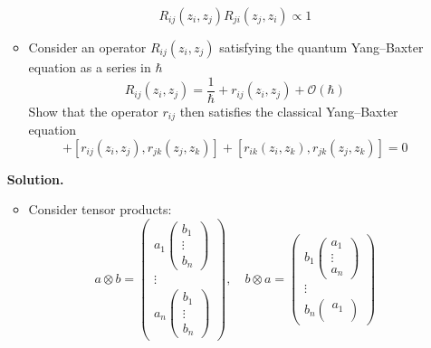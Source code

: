 \documentclass[12pt]{article}
\theoremstyle{definition}
\begin{document}
\begin{enumerate}
\begin{itemize}
\begin{equation}
            R_{ij}(z_i,z_j)R_{ji}(z_j,z_i)\propto 1
        \end{equation}
        \item Consider an operator $R_{ij} (z_i, z_j )$ satisfying the quantum Yang–Baxter equation as a series in $\hbar$
        \begin{equation}
            R_{ij}(z_i,z_j) = \frac{1}{\hbar} + r_{ij}(z_i,z_j) + \mathcal{O}(\hbar)
        \end{equation}
        Show that the operator $r_{ij}$ then satisfies the classical Yang–Baxter equation
        \begin{equation}
            [r_{ij}(z_i, z_j), r_{ik}(z_i, z_k)] + [r_{ij}(z_i, z_j), r_{jk}(z_j, z_k)] + [r_{ik}(z_i, z_k), r_{jk}(z_j, z_k)] = 0
        \end{equation}
    \end{itemize}
    \textbf{Solution.}
    \begin{itemize}
        \item Consider tensor products:
        \begin{equation}
            a\otimes b=\begin{pmatrix}
                a_1\begin{pmatrix}
                    b_1\\
                    \vdots\\
                    b_n
                \end{pmatrix}\\
                \vdots\\
                a_n\begin{pmatrix}
                    b_1\\
                    \vdots\\
                    b_n
                \end{pmatrix}
            \end{pmatrix},\quad b\otimes a=\begin{pmatrix}
                b_1\begin{pmatrix}
                    a_1\\
                    \vdots\\
                    a_n
                \end{pmatrix}\\
                \vdots\\
                b_n\begin{pmatrix}
                    a_1\\

\end{pmatrix}
\end{pmatrix}
\end{equation}
\end{itemize}
\end{enumerate}
\end{document}
